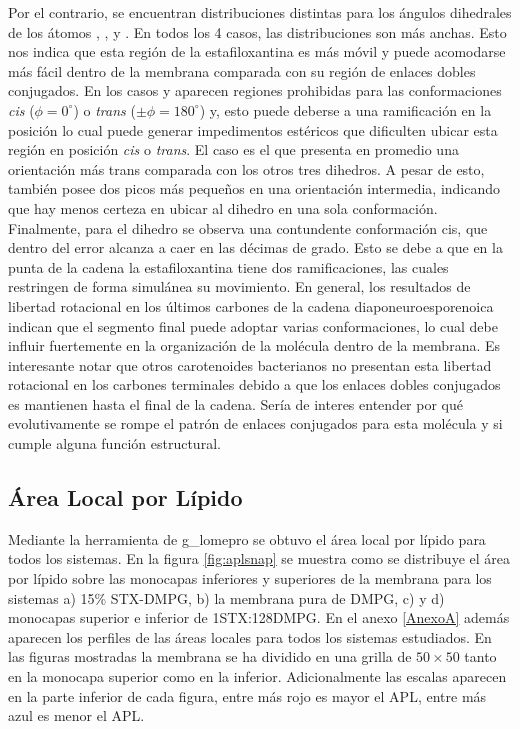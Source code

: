 Por el contrario, se encuentran distribuciones distintas para los \'{a}ngulos dihedrales  de los \'{a}tomos ,  ,  y . En todos los 4 casos, las distribuciones son m\'{a}s anchas. Esto nos indica que esta regi\'{o}n de la estafiloxantina es m\'{a}s m\'{o}vil y puede acomodarse m\'{a}s f\'{a}cil dentro de la membrana comparada con su regi\'{o}n de enlaces dobles conjugados. En los casos  y  aparecen regiones prohibidas para las conformaciones \textit{cis} ($\phi=0^{\circ}$) o \textit{trans} ($\pm\phi=180^{\circ}$) y, esto puede deberse a una ramificaci\'{o}n en la posici\'{o}n  lo cual puede generar impedimentos est\'{e}ricos que dificulten ubicar esta regi\'{o}n en posici\'{o}n \textit{cis} o \textit{trans}.  El caso  es el que presenta en promedio una orientaci\'{o}n m\'{a}s trans comparada con los otros tres dihedros. A pesar de esto, tambi\'{e}n posee dos picos m\'{a}s peque\~{n}os en una orientaci\'{o}n intermedia, indicando que hay menos certeza en ubicar al dihedro en una sola conformaci\'{o}n. Finalmente, para el dihedro  se observa una contundente conformaci\'{o}n cis, que dentro del error alcanza a caer en las d\'{e}cimas de grado. Esto se debe a que en la punta de la cadena la estafiloxantina tiene dos ramificaciones, las cuales restringen de forma simul\'{a}nea su movimiento. En general, los resultados de libertad rotacional en los \'{u}ltimos carbones de la cadena diaponeuroesporenoica indican que el segmento final puede adoptar varias conformaciones, lo cual debe influir fuertemente en la organizaci\'{o}n de la mol\'{e}cula dentro de la membrana. Es interesante notar que otros carotenoides bacterianos no presentan esta libertad rotacional en los carbones terminales debido a que los enlaces dobles conjugados es mantienen hasta el final de la cadena. Ser\'{i}a de interes entender por qu\'{e} evolutivamente se rompe el patr\'{o}n de enlaces conjugados para esta mol\'{e}cula y si cumple alguna funci\'{o}n estructural.\\

\subsection{\'{A}rea Local por L\'{i}pido}
Mediante la herramienta de g\_lomepro se obtuvo el \'{a}rea local por l\'{i}pido para todos los sistemas. En la figura \ref{fig:aplsnap} se muestra como se distribuye el \'{a}rea por l\'{i}pido sobre las monocapas inferiores y superiores de la membrana para los sistemas a) 15\% STX-DMPG, b) la membrana pura de DMPG, c) y d) monocapas superior e inferior de 1STX:128DMPG. En el anexo \ref{AnexoA} adem\'{a}s aparecen los perfiles de las \'{a}reas locales para todos los sistemas estudiados. En las figuras mostradas la membrana se ha dividido en una grilla de $50\times 50$ tanto en la monocapa superior como en la inferior. Adicionalmente las escalas aparecen en la parte inferior de cada figura, entre m\'{a}s rojo es mayor el APL, entre m\'{a}s azul es menor el APL.\\ 

